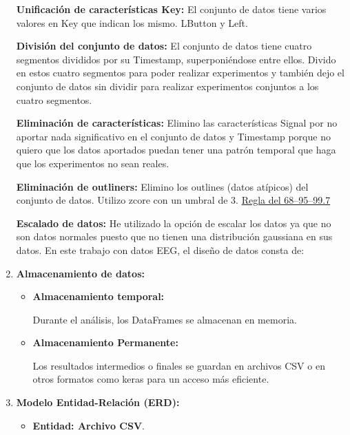\begin{enumerate}
\textbf{Unificación de características Key:} El conjunto de datos tiene varios valores en Key que indican los mismo. LButton y Left.


\textbf{División del conjunto de datos:} El conjunto de datos tiene cuatro segmentos divididos por su Timestamp, superponiéndose entre ellos. Divido en estos cuatro segmentos para poder realizar experimentos y también dejo el conjunto de datos sin dividir para realizar experimentos conjuntos a los cuatro segmentos.


\textbf{Eliminación de características:} Elimino las características Signal por no aportar nada significativo en el conjunto de datos y Timestamp porque no quiero que los datos aportados puedan tener una patrón temporal que haga que los experimentos no sean reales.

\textbf{Eliminación de outliners:} Elimino los outlines (datos atípicos) del conjunto de datos. Utilizo zcore con un umbral de 3. \href{https://en.wikipedia.org/wiki/68%E2%80%9395%E2%80%9399.7_rule}{Regla del 68–95–99.7}


\textbf{Escalado de datos:} He utilizado la opción de escalar los datos ya que no son datos normales puesto que no tienen una distribución gaussiana en sus datos. En este trabajo con datos EEG, el diseño de datos consta de:

\item 
\textbf{Almacenamiento de datos:}

\begin{itemize}
   \tightlist
   \item
    \textbf{Almacenamiento temporal:}
    
    Durante el análisis, los DataFrames se almacenan en memoria.
    \item
    \textbf{Almacenamiento Permanente:}
    
    Los resultados intermedios o finales se guardan en archivos CSV o en otros formatos como keras para un acceso más eficiente.    
\end{itemize}        

\item 
\textbf{Modelo Entidad-Relación (ERD):}

\begin{itemize}
   \tightlist
   \item
    \textbf{Entidad: Archivo CSV}.
    

\end{itemize}
\end{enumerate}
